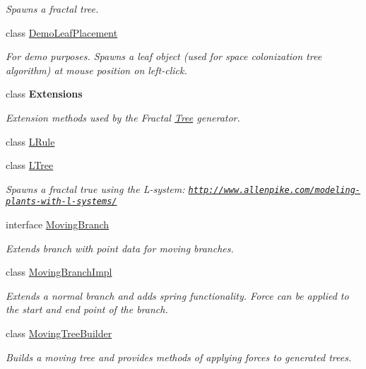 \begin{DoxyCompactItemize}
\begin{DoxyCompactList}\small\item\em Spawns a fractal tree. \end{DoxyCompactList}\item 
class \hyperlink{class_fractal_tree_1_1_demo_leaf_placement}{Demo\+Leaf\+Placement}
\begin{DoxyCompactList}\small\item\em For demo purposes. Spawns a leaf object (used for space colonization tree algorithm) at mouse position on left-\/click. \end{DoxyCompactList}\item 
class {\bfseries Extensions}
\begin{DoxyCompactList}\small\item\em Extension methods used by the Fractal \hyperlink{interface_fractal_tree_1_1_tree}{Tree} generator. \end{DoxyCompactList}\item 
class \hyperlink{class_fractal_tree_1_1_l_rule}{L\+Rule}
\item 
class \hyperlink{class_fractal_tree_1_1_l_tree}{L\+Tree}
\begin{DoxyCompactList}\small\item\em Spawns a fractal true using the L-\/system\+: \href{http://www.allenpike.com/modeling-plants-with-l-systems/}{\tt http\+://www.\+allenpike.\+com/modeling-\/plants-\/with-\/l-\/systems/} \end{DoxyCompactList}\item 
interface \hyperlink{interface_fractal_tree_1_1_moving_branch}{Moving\+Branch}
\begin{DoxyCompactList}\small\item\em Extends branch with point data for moving branches. \end{DoxyCompactList}\item 
class \hyperlink{class_fractal_tree_1_1_moving_branch_impl}{Moving\+Branch\+Impl}
\begin{DoxyCompactList}\small\item\em Extends a normal branch and adds spring functionality. Force can be applied to the start and end point of the branch. \end{DoxyCompactList}\item 
class \hyperlink{class_fractal_tree_1_1_moving_tree_builder}{Moving\+Tree\+Builder}
\begin{DoxyCompactList}\small\item\em Builds a moving tree and provides methods of applying forces to generated trees. \end{DoxyCompactList}\item 

\end{DoxyCompactItemize}
